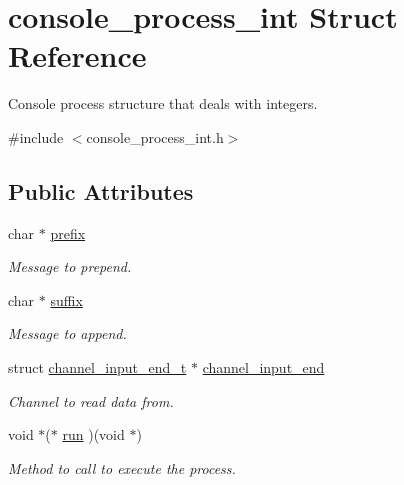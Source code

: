 \hypertarget{structconsole__process__int}{\section{console\-\_\-process\-\_\-int Struct Reference}
\label{structconsole__process__int}
}


Console process structure that deals with integers.  




{\ttfamily \#include $<$console\-\_\-process\-\_\-int.\-h$>$}

\subsection*{Public Attributes}
\begin{DoxyCompactItemize}
\item 
\hypertarget{structconsole__process__int_a73987543b6fcef970427a5f5c9b89865}{char $\ast$ \hyperlink{structconsole__process__int_a73987543b6fcef970427a5f5c9b89865}{prefix}}\label{structconsole__process__int_a73987543b6fcef970427a5f5c9b89865}

\begin{DoxyCompactList}\small\item\em Message to prepend. \end{DoxyCompactList}\item 
\hypertarget{structconsole__process__int_a94636e0e828894757a66e4446d2b5d60}{char $\ast$ \hyperlink{structconsole__process__int_a94636e0e828894757a66e4446d2b5d60}{suffix}}\label{structconsole__process__int_a94636e0e828894757a66e4446d2b5d60}

\begin{DoxyCompactList}\small\item\em Message to append. \end{DoxyCompactList}\item 
\hypertarget{structconsole__process__int_ad7eff16845b0e7d2419b88d0d40168d1}{struct \hyperlink{structchannel__input__end__t}{channel\-\_\-input\-\_\-end\-\_\-t} $\ast$ \hyperlink{structconsole__process__int_ad7eff16845b0e7d2419b88d0d40168d1}{channel\-\_\-input\-\_\-end}}\label{structconsole__process__int_ad7eff16845b0e7d2419b88d0d40168d1}

\begin{DoxyCompactList}\small\item\em Channel to read data from. \end{DoxyCompactList}\item 
\hypertarget{structconsole__process__int_a583f528489e0ce6d7792a1d5f09d4fa1}{void $\ast$($\ast$ \hyperlink{structconsole__process__int_a583f528489e0ce6d7792a1d5f09d4fa1}{run} )(void $\ast$)}\label{structconsole__process__int_a583f528489e0ce6d7792a1d5f09d4fa1}

\begin{DoxyCompactList}\small\item\em Method to call to execute the process. \end{DoxyCompactList}\end{DoxyCompactItemize}


